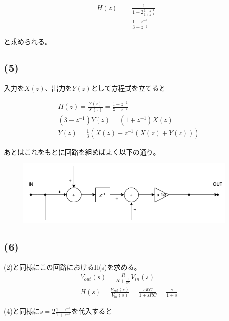 \documentclass[a4paper,12pt,xelatex,ja=standard]{bxjsarticle}
\begin{document}
\begin{equation*}
  \begin{split}
    H(z)
      &= \frac{1}{1 + 2 \frac{1 - z^{-1}}{1 + z^{-1}}} \\
      &= \frac{1 + z^{-1}}{3 - z^{-1}}
  \end{split}
\end{equation*}

と求められる。

\subsection*{(5)}
入力を$X(z)$、出力を$Y(z)$として方程式を立てると

\begin{equation*}
  \begin{split}
    &H(z) = \frac{Y(z)}{X(z)} = \frac{1 + z^{-1}}{3 - z^{-1}} \\
    &(3 - z^{-1}) Y(z) = (1 + z^{-1})X(z) \\
    &Y(z) = \frac{1}{3}(X(z) + z^{-1}(X(z) + Y(z)))
  \end{split}
\end{equation*}

あとはこれをもとに回路を組めばよく以下の通り。

\begin{figure}[H]
  \centering
  \includegraphics[width=11cm]{images/2018_5_circuit.png}
\end{figure}

\subsection*{(6)}
(2)と同様にこの回路におけるH(s)を求める。
\begin{equation*}
  \begin{split}
    &V_{out}(s) = \frac{R}{R + \frac{1}{sC}}V_{in}(s) \\
    &H(s) = \frac{V_{out}(s)}{V_{in}(s)} = \frac{sRC}{1 + sRC} = \frac{s}{1 + s}
  \end{split}
\end{equation*}

(4)と同様に$s = 2 \frac{1 - z^{-1}}{1 + z^{-1}}$を代入すると
\end{document}
